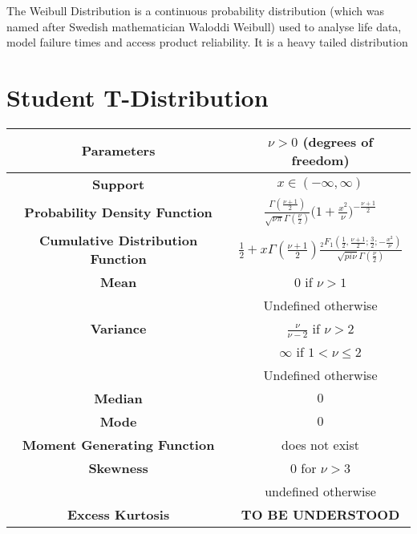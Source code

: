 \documentclass[14pt, a4paper]{article}
\theoremstyle{definition}
\begin{document}
  
The Weibull Distribution is a continuous probability distribution (which was named after Swedish mathematician Waloddi Weibull) used to analyse life data, model failure times and access product reliability. It is a heavy tailed distribution

\section{Student T-Distribution}

\begin{center}
    \begin{tabular}{|c|c|}  %
\hline
 \textbf{Parameters }& $\nu > 0$ (degrees of freedom) \\
 \hline
 \textbf{Support} & $x \in (- \infty,\infty)$ \\
 \hline
 \textbf{Probability Density Function} & $\frac{\Gamma (\frac{\nu +1}{2})}{\sqrt{\nu \pi} \Gamma(\frac{\nu}{2})} \Big( 1+ \frac{x^2}{\nu} \Big) ^{- \frac{\nu+1}{2}}$ \\
 \hline
 \textbf{Cumulative Distribution Function} & $\frac{1}{2} + x \Gamma(\frac{\nu+1}{2} ) \frac{_2F_1 (\frac{1}{2} , \frac{\nu + 1}{2} ; \frac{3}{2} ; - \frac{x^2}{\nu} )}{\sqrt{pi \nu } \Gamma(\frac{\nu}{2} )}$  \\
 \hline
 \textbf{Mean} & $0$ if $\nu > 1$ \\ & Undefined otherwise\\ 
 \hline
 \textbf{Variance} & $\frac{\nu}{\nu - 2}$ if $\nu > 2$ \\ & $\infty$ if $1 < \nu \leq 2$ \\ & Undefined otherwise \\
 \hline
 \textbf{Median} &  $0$\\ 
 \hline
 \textbf{Mode} & $0$\\
 \hline
 \textbf{Moment Generating Function} & does not exist \\
 \hline
 \textbf{Skewness} & $0 $ for $ \nu > 3 $ \\ & undefined otherwise \\
 \hline
 \textbf{Excess Kurtosis} & \textbf{TO BE UNDERSTOOD} \\
 \hline
       
  \end{tabular}
\end{center}
\end{document}
